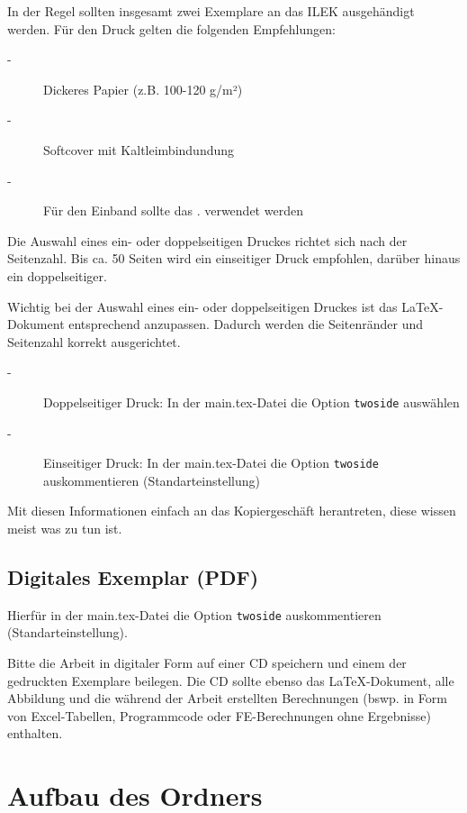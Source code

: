 In der Regel sollten insgesamt zwei Exemplare an das ILEK ausgehändigt werden. Für den Druck gelten die folgenden Empfehlungen:

\begin{description}
	\item[-] Dickeres Papier (z.B. 100-120 g/m²)
	\item[-] Softcover mit Kaltleimbindundung
	\item[-] Für den Einband sollte das . verwendet werden 
\end{description}

Die Auswahl eines ein- oder doppelseitigen Druckes richtet sich nach der Seitenzahl. Bis ca. 50 Seiten wird ein einseitiger Druck empfohlen, darüber hinaus ein doppelseitiger.

Wichtig bei der Auswahl eines ein- oder doppelseitigen Druckes ist das LaTeX-Dokument entsprechend anzupassen. Dadurch werden die Seitenränder und Seitenzahl korrekt ausgerichtet.

\begin{description}
	\item[-] Doppelseitiger Druck: In der main.tex-Datei die Option \lstinline[basicstyle=\ttfamily]|twoside| auswählen
	\item[-] Einseitiger Druck: In der main.tex-Datei die Option \lstinline[basicstyle=\ttfamily]|twoside| auskommentieren (Standarteinstellung)
\end{description}

Mit diesen Informationen einfach an das Kopiergeschäft herantreten, diese wissen meist was zu tun ist.

\subsection*{Digitales Exemplar (PDF)}

Hierfür in der main.tex-Datei die Option \lstinline[basicstyle=\ttfamily]|twoside| auskommentieren (Standarteinstellung).

Bitte die Arbeit in digitaler Form auf einer CD speichern und einem der gedruckten Exemplare beilegen. Die CD sollte ebenso das LaTeX-Dokument, alle Abbildung und die während der Arbeit erstellten Berechnungen (bswp. in Form von Excel-Tabellen, Programmcode oder FE-Berechnungen ohne Ergebnisse) enthalten.

\newpage

\section*{Aufbau des Ordners}

